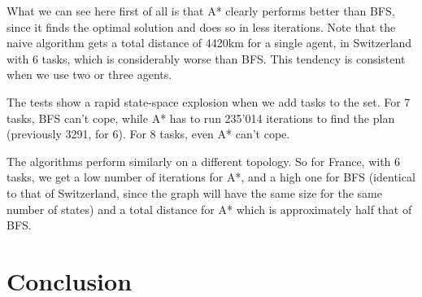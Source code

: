 \documentclass[12pt,a4paper]{article}
\begin{document}
What we can see here first of all is that A* clearly performs better than BFS, since it finds the optimal solution and does so in less iterations. Note that the naive algorithm gets a total distance of 4420km for a single agent, in Switzerland with 6 tasks, which is considerably worse than BFS. This tendency is consistent when we use two or three agents.

The tests show a rapid state-space explosion when we add tasks to the set. For 7 tasks, BFS can't cope, while A* has to run 235'014 iterations to find the plan (previously 3291, for 6). For 8 tasks, even A* can't cope. 

The algorithms perform similarly on a different topology. So for France, with 6 tasks, we get a low number of iterations for A*, and a high one for BFS (identical to that of Switzerland, since the graph will have the same size for the same number of states) and a total distance for A* which is approximately half that of BFS.

\section{Conclusion}
\end{document}

